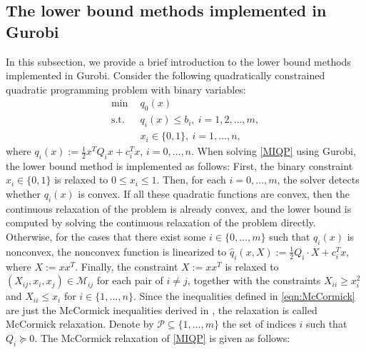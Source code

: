 \documentclass[pdflatex,sn-mathphys-num]{sn-jnl}%
\theoremstyle{thmstyleone}%
\theoremstyle{thmstyletwo}%
\theoremstyle{thmstylethree}%
\begin{document}
\subsection{The lower bound methods implemented in Gurobi}\label{sec31}

In this subsection, we provide a brief introduction to the lower bound methods implemented in Gurobi.
Consider the following quadratically constrained quadratic programming problem with binary variables:
\begin{equation}\label{MIQP}\tag{MIQP}
	\begin{aligned}
		\min ~&~q_0(x) \\
		\mbox{s.t.} ~&~q_i(x)\leq b_i,~i=1,2,\ldots,m,\\
		~&~ x_i\in \{0,1\},~i=1,\ldots,n,
	\end{aligned}
\end{equation}
where $q_i(x):=\frac{1}{2}x^{T}Q_i x+c_i^{T}x$, $i=0,\ldots,n$.
When solving \eqref{MIQP} using Gurobi, the lower bound method is implemented as follows: First, the binary constraint $x_i\in \{0,1\}$ is relaxed to $0\leq x_i \leq 1$. Then, for each $i=0,\ldots,m$, the solver detects whether $q_i(x)$ is convex. If all these quadratic functions are convex, then the continuous relaxation of the problem is already convex, and the lower bound is computed by solving the continuous relaxation of the problem directly. Otherwise, for the cases that there exist some $i\in\{0,\ldots,m\}$ such that $q_i(x)$ is nonconvex, the nonconvex function is linearized to $\hat{q}_i(x,X):=\frac{1}{2}Q_i \cdot X+c_i^{T}x$, where $X:=xx^T$. Finally, the constraint $X:=xx^T$ is relaxed to $(X_{ij},x_i,x_j)\in\mathcal{M}_{ij}$ for each pair of $i\neq j$, together with the constraints $X_{ii}\geq x_i^2$ and $X_{ii} \leq x_i$ for  $i\in\{1,\ldots,n\}$. Since the inequalities defined in \eqref{eqn:McCormick} are just the McCormick inequalities derived in \cite{McCormick}, the relaxation  is called McCormick relaxation. Denote by $\mathcal{P}\subseteq\{1,\ldots,m\}$ the set of indices $i$ such that $Q_i\succeq 0$. The McCormick relaxation of \eqref{MIQP} is given as follows:
\end{document}

